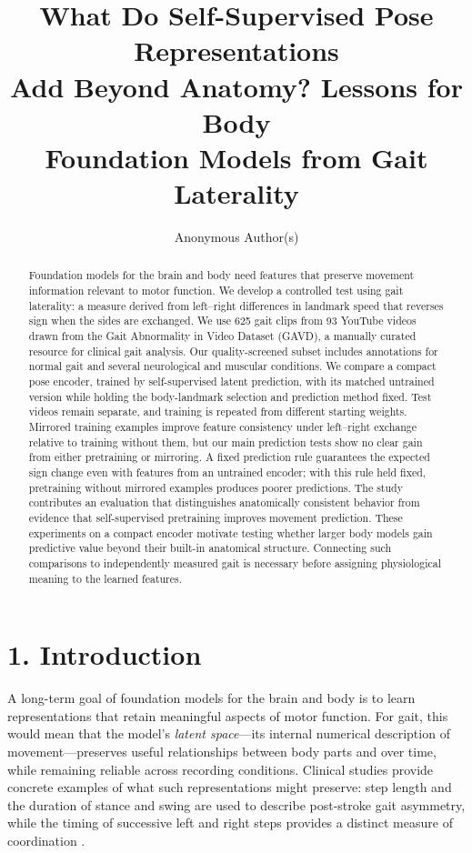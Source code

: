 \documentclass{article}
\title{What Do Self-Supervised Pose Representations\\Add Beyond Anatomy?
Lessons for Body\\Foundation Models from Gait Laterality}
\author{Anonymous Author(s)}
\begin{document}
\maketitle
\begin{abstract}
Foundation models for the brain and body need features that preserve
movement information relevant to motor function. We develop a controlled
test using gait laterality: a measure derived from left--right
differences in landmark speed that reverses sign when the sides are
exchanged. We use 625 gait clips from 93 YouTube videos drawn from the
Gait Abnormality in Video Dataset (GAVD), a manually curated resource
for clinical gait analysis. Our quality-screened subset includes
annotations for normal gait and several neurological and muscular
conditions. We compare a compact pose encoder, trained by
self-supervised latent prediction, with its matched untrained version
while holding the body-landmark selection and prediction method fixed.
Test videos remain separate, and training is repeated from different
starting weights. Mirrored training examples improve feature consistency
under left--right exchange relative to training without them, but our
main prediction tests show no clear gain from either pretraining or
mirroring. A fixed prediction rule guarantees the expected sign change
even with features from an untrained encoder; with this rule held fixed,
pretraining without mirrored examples produces poorer predictions. The
study contributes an evaluation that distinguishes anatomically
consistent behavior from evidence that self-supervised pretraining
improves movement prediction. These experiments on a compact encoder
motivate testing whether larger body models gain predictive value beyond
their built-in anatomical structure. Connecting such comparisons to
independently measured gait is necessary before assigning physiological
meaning to the learned features.
\end{abstract}
\section{1. Introduction}\label{introduction}

A long-term goal of foundation models for the brain and body is to learn
representations that retain meaningful aspects of motor function. For
gait, this would mean that the model's \emph{latent space}---its
internal numerical description of movement---preserves useful
relationships between body parts and over time, while remaining reliable
across recording conditions. Clinical studies provide concrete examples
of what such representations might preserve: step length and the
duration of stance and swing are used to describe post-stroke gait
asymmetry, while the timing of successive left and right steps provides
a distinct measure of coordination
\citep{patterson2010symmetry, meijer2011coordination}.
\end{document}
